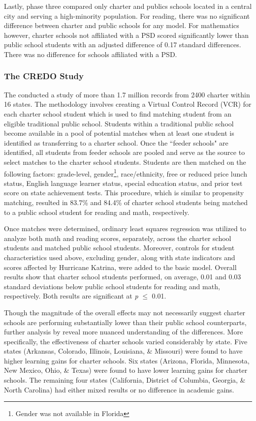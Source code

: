 \documentclass[letterpaper,12p,twoside]{article} %
\begin{document}
Lastly, phase three compared only charter and publics schools located in a central city and serving a high-minority population. For reading, there was no significant difference between charter and public schools for any model. For mathematics however, charter schools not affiliated with a PSD scored significantly lower than public school students with an adjusted difference of 0.17 standard differences. There was no difference for schools affiliated with a PSD.


\subsubsection{The CREDO Study}
The  conducted a study of more than 1.7 million records from 2400 charter within 16 states. The methodology involves creating a Virtual Control Record (VCR) for each charter school student \cite<see also,>{abadie2007,nea} which is used to find matching student from an eligible traditional public school. Students within a traditional public school become available in a pool of potential matches when at least one student is identified as transferring to a charter school. Once the ``feeder schools" are identified, all students from feeder schools are pooled and serve as the source to select matches to the charter school students. Students are then matched on the following factors: grade-level, gender\footnote{Gender was not available in Florida}, race/ethnicity, free or reduced price lunch status, English language learner status, special education status, and prior test score on state achievement tests. This procedure, which is similar to propensity matching, resulted in 83.7\% and 84.4\% of charter school students being matched to a public school student for reading and math, respectively.

Once matches were determined, ordinary least squares regression was utilized to analyze both math and reading scores, separately, across the charter school students and matched public school students. Moreover, controls for student characteristics used above, excluding gender, along with state indicators and scores affected by Hurricane Katrina, were added to the basic model. Overall results show that charter school students performed, on average, 0.01 and 0.03 standard deviations below public school students for reading and math, respectively. Both results are significant at \textit{p} $\leq$ 0.01.

Though the magnitude of the overall effects may not necessarily suggest charter schools are performing substantially lower than their public school counterparts, further analysis by  reveal more nuanced understanding of the differences. More specifically, the effectiveness of charter schools varied considerably by state. Five states (Arkansas, Colorado, Illinois, Louisiana, \& Missouri) were found to have higher learning gains for charter schools. Six states (Arizona, Florida, Minnesota, New Mexico, Ohio, \& Texas) were found to have lower learning gains for charter schools. The remaining four states (California, District of Columbia, Georgia, \& North Carolina) had either mixed results or no difference in academic gains. 
\end{document}
